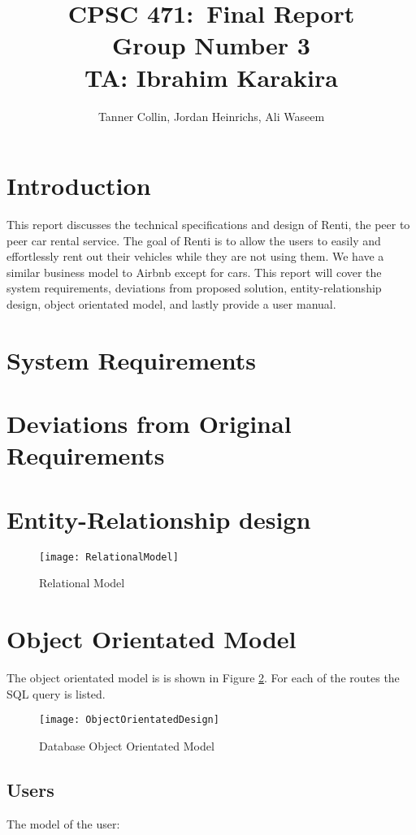 \documentclass{article}
\title{
\vspace{2in}
\textmd{\textbf{CPSC 471:\ Final Report}}\\
\normalsize\vspace{0.1in}\small{Group Number 3 \\ TA: Ibrahim Karakira}\\
\vspace{3in}
}
\author{Tanner Collin, Jordan Heinrichs, Ali Waseem}
\date{}
\begin{document}
\maketitle
\newpage
\tableofcontents
\newpage

\section{Introduction}
This report discusses the technical specifications and design of Renti, the peer to peer car rental service.
The goal of Renti is to allow the users to easily and effortlessly rent out their vehicles while they are not using them.
We have a similar business model to Airbnb except for cars. This report will cover the system requirements,
deviations from proposed solution, entity-relationship design, object orientated model, and lastly provide a user manual.

\section{System Requirements}

\section{Deviations from Original Requirements}

\section{Entity-Relationship design}
\begin{figure}[ht!]
    \centering
    \texttt{[image: RelationalModel]}
    \caption{Relational Model}
    \label{fig:relationalmodel}
\end{figure}

\section{Object Orientated Model}
The object orientated model is is shown in Figure \ref{fig:oomodel}. For each of the
routes the SQL query is listed.
\begin{figure}[ht!]
    \centering
    \texttt{[image: ObjectOrientatedDesign]}
    \caption{Database Object Orientated Model}
    \label{fig:oomodel}
\end{figure}
\subsection{Users}
The model of the user:
\end{document}
